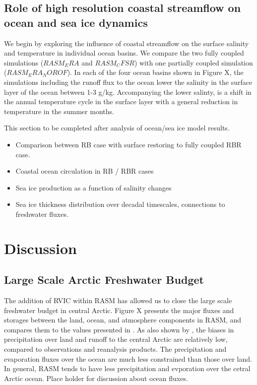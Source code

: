 \documentclass[jgrga, draft]{agutex}
\begin{document}
\begin{article}
\subsection{Role of high resolution coastal streamflow on ocean and sea ice dynamics}

We begin by exploring the influence of coastal streamflow on the surface salinity and temperature in individual ocean basins.
We compare the two fully coupled simulations ($RASM_ERA$ and $RASM_CFSR$) with one partially coupled simulation ($RASM_ERA_NOROF$).
In each of the four ocean basins shown in Figure X, the simulations including the runoff flux to the ocean lower the salinity in the surface layer of the ocean between 1-3 g/kg.
Accompanying the lower salinty, is a shift in the annual temperature cycle in the surface layer with a general reduction in temperature in the summer months.

This section to be completed after analysis of ocean/sea ice model results.
\begin{itemize}
\item Comparison between RB case with surface restoring to fully coupled RBR case.
\item Coastal ocean circulation in RB / RBR cases
\item Sea ice production as a function of salinity changes
\item Sea ice thickness distribution over decadal timescales, connections to freshwater fluxes.
\end{itemize}

\section{Discussion}

\subsection{Large Scale Arctic Freshwater Budget}
The addition of RVIC within RASM has allowed us to close the large scale freshwater budget in central Arctic.
Figure X presents the major fluxes and storages between the land, ocean, and atmosphere components in RASM, and compares them to the values presented in \citet{Serreze_2006}.
As also shown by \citet{Hamman_2015}, the biases in precipitation over land and runoff to the central Arctic are relatively low, compared to observations and reanalysis products.
The precipitation and evaporation fluxes over the ocean are much less constrained than those over land.
In general, RASM tends to have less precipitation and evporation over the cetral Arctic ocean.
Place holder for discussion about ocean fluxes.


\end{article}
\end{document}
